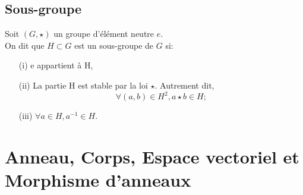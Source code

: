 \subsection{Sous-groupe}
\begin{madefinition}
	Soit $(G, \star)$ un groupe d'élément neutre $e$. \\
	On dit que $H \subset G$ est un sous-groupe de $G$ si:
	\begin{enumerate}
		\item[(i)] e appartient à H,
		\item[(ii)] La partie H est stable par la loi $\star$. Autrement dit, 
		\[\forall (a,b) \in H^2, a \star b \in H;\]
		\item[(iii)] $\forall a \in H, a^{-1} \in H$.
	\end{enumerate}
\end{madefinition}

\section{Anneau, Corps, Espace vectoriel et Morphisme d'anneaux}
